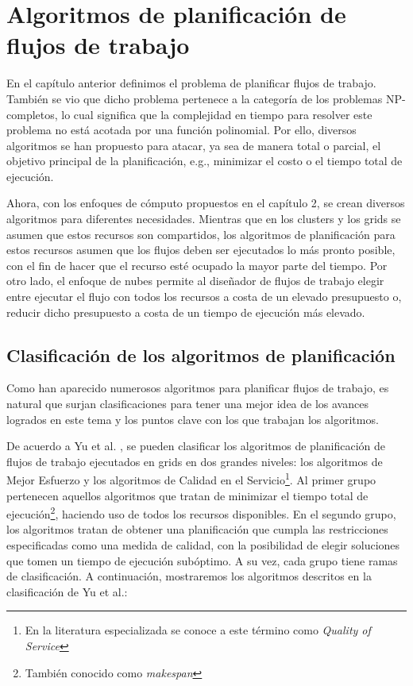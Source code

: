 \chapter[Planificación de flujos de trabajo]{Algoritmos de planificación de flujos de trabajo}
\label{chap:scheduling_algorithms}

En el capítulo anterior definimos el problema de planificar flujos de trabajo. También se vio que dicho problema pertenece a la categoría de los problemas NP-completos, lo cual significa que la complejidad en tiempo para resolver este problema no está acotada por una función polinomial. Por ello, diversos algoritmos se han propuesto para atacar, ya sea de manera total o parcial, el objetivo principal de la planificación, e.g., minimizar el costo o el tiempo total de ejecución.

Ahora, con los enfoques de cómputo propuestos en el capítulo 2, se crean diversos algoritmos para diferentes necesidades. Mientras que en los clusters y los grids se asumen que estos recursos son compartidos, los algoritmos de planificación para estos recursos asumen que los flujos deben ser ejecutados lo más pronto posible, con el fin de hacer que el recurso esté ocupado la mayor parte del tiempo. Por otro lado, el enfoque de nubes permite al diseñador de flujos de trabajo elegir entre ejecutar el flujo con todos los recursos a costa de un elevado presupuesto o, reducir dicho presupuesto a costa de un tiempo de ejecución más elevado.

\section{Clasificación de los algoritmos de planificación}
Como han aparecido numerosos algoritmos para planificar flujos de trabajo, es natural que surjan clasificaciones \cite{topcuoglu2002performance} \cite{yu2008workflow} para tener una mejor idea de los avances logrados en este tema y los puntos clave con los que trabajan los algoritmos.

De acuerdo a Yu et al. \cite{yu2008workflow}, se pueden clasificar los algoritmos de planificación de flujos de trabajo ejecutados en grids en dos grandes niveles: los algoritmos de Mejor Esfuerzo y los algoritmos de Calidad en el Servicio\footnote{En la literatura especializada se conoce a este término como \emph{Quality of Service}}. Al primer grupo pertenecen aquellos algoritmos que tratan de minimizar el tiempo total de ejecución\footnote{También conocido como \emph{makespan}}, haciendo uso de todos los recursos disponibles. En el segundo grupo, los algoritmos tratan de obtener una planificación que cumpla las restricciones especificadas como una medida de calidad, con la posibilidad de elegir soluciones que tomen un tiempo de ejecución subóptimo. A su vez, cada grupo tiene ramas de clasificación. A continuación, mostraremos los algoritmos descritos en la clasificación de Yu et al.: %

